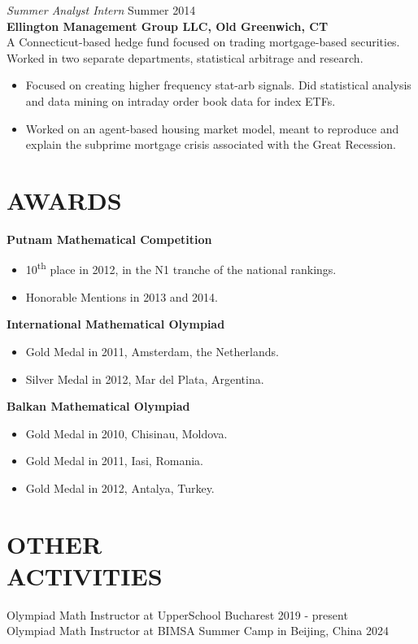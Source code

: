 \documentclass[margin]{res}
\begin{document}
\begin{resume}
  {\sl Summer Analyst Intern} \hfill Summer 2014 \\
  \textbf{Ellington Management Group LLC, Old Greenwich, CT} \\
  A Connecticut-based hedge fund focused on trading mortgage-based securities.
  Worked in two separate departments, statistical arbitrage and research.
  \begin{itemize} \itemsep -2pt
    \item Focused on creating higher frequency stat-arb signals.
      Did statistical analysis and data mining on intraday order book data for index ETFs.
    \item Worked on an agent-based housing market model, meant to reproduce and explain the
      subprime mortgage crisis associated with the Great Recession.
  \end{itemize}
  
  \section{AWARDS} \textbf{Putnam Mathematical Competition}
  \begin{itemize} \itemsep -2pt
    \item 10\textsuperscript{th} place in 2012, in the N1 tranche of the national rankings.
    \item Honorable Mentions in 2013 and 2014.
  \end{itemize}
  \textbf{International Mathematical Olympiad}
  \begin{itemize} \itemsep -1pt
    \item Gold Medal in 2011, Amsterdam, the Netherlands.
    \item Silver Medal in 2012, Mar del Plata, Argentina.
  \end{itemize}
  \textbf{Balkan Mathematical Olympiad}
  \begin{itemize} \itemsep -1pt
    \item Gold Medal in 2010, Chisinau, Moldova.
    \item Gold Medal in 2011, Iasi, Romania.
    \item Gold Medal in 2012, Antalya, Turkey.
  \end{itemize}


  \section{OTHER \\ ACTIVITIES} 
  Olympiad Math Instructor at UpperSchool Bucharest \hfill 2019 - present \\
  Olympiad Math Instructor at BIMSA Summer Camp in Beijing, China \hfill 2024


\end{resume}
\end{document}
